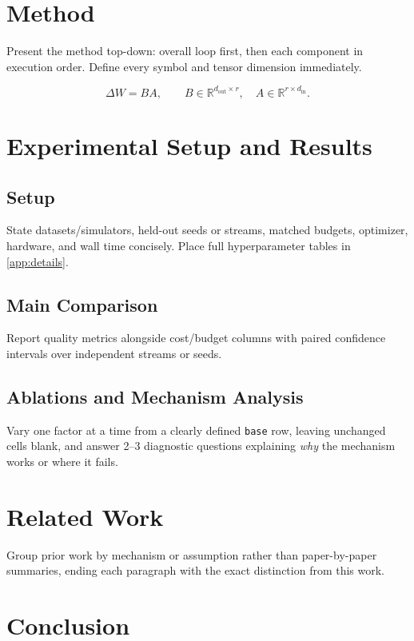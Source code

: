 \documentclass[11pt]{article}
\newcommand{\R}{\mathbb{R}}
\begin{document}
\section{Method}
\label{sec:method}

Present the method top-down: overall loop first, then each component in
execution order. Define every symbol and tensor dimension immediately.

\begin{equation}
\label{eq:core}
  \Delta W = B A, \qquad B \in \R^{d_{\mathrm{out}} \times r}, \quad A \in \R^{r \times d_{\mathrm{in}}}.
\end{equation}

\section{Experimental Setup and Results}
\label{sec:experiments}

\subsection{Setup}
State datasets/simulators, held-out seeds or streams, matched budgets, optimizer,
hardware, and wall time concisely. Place full hyperparameter tables in
\cref{app:details}.

\subsection{Main Comparison}
Report quality metrics alongside cost/budget columns with paired confidence
intervals over independent streams or seeds.

\subsection{Ablations and Mechanism Analysis}
Vary one factor at a time from a clearly defined \texttt{base} row, leaving
unchanged cells blank, and answer 2--3 diagnostic questions explaining
\emph{why} the mechanism works or where it fails.

\section{Related Work}
\label{sec:related}

Group prior work by mechanism or assumption rather than paper-by-paper summaries,
ending each paragraph with the exact distinction from this work.

\section{Conclusion}
\label{sec:conclusion}
\end{document}
